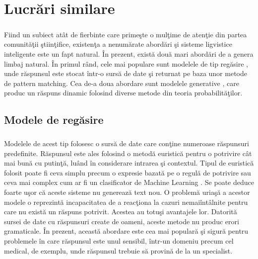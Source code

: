\chapter{Lucr\u ari similare}

\paragraph{}
Fiind un subiect at\^ at de fierbinte care prime\c ste o mul\c time de aten\c tie din partea comunit\u a\c tii \c stiin\c tifice, existen\c ta a nenum\u arate abord\u ari \c si sisteme ligvistice inteligente este un fapt natural. \^ In prezent, exist\u a dou\u a mari abord\u ari de a genera limbaj natural. \^ In primul r\^ and, cele mai populare sunt modelele de tip reg\u asire \cite{chatbot-models}, unde r\u aspunsul este stocat \^ intr-o surs\u a de date \c si returnat pe baza unor metode de pattern matching. Cea de-a doua abordare sunt modelele generative \cite{chatbot-models}, care produc un r\u aspuns dinamic folosind diverse metode din teoria probabilit\u a\c tilor.

\section{Modele de reg\u asire}

\paragraph{}
Modelele de acest tip folosesc o surs\u a de date care con\c tine numeroase r\u aspunsuri predefinite. R\u aspunsul este ales folosind o metod\u a euristic\u a pentru o potrivire c\^ at mai bun\u a cu putin\c t\u a, lu\^ and \^ in considerare intrarea \c si contextul. Tipul de euristic\u a folosit poate fi ceva simplu precum o expresie bazat\u a pe o regul\u a de potrivire sau ceva mai complex cum ar fi un clasificator de Machine Learning \cite{retrieval-chatbots}. Se poate deduce foarte u\c sor c\u a aceste sisteme nu genereaz\u a text nou. O problem\u a uria\c s\u a a acestor modele o reprezint\u a incapacitatea de a reac\c tiona la cazuri nemai\^ int\^ alnite pentru care nu exist\u a un r\u aspuns potrivit. Acestea au totu\c si avantajele lor. Datorit\u a sursei de date cu r\u aspunsuri create de oameni, aceste metode nu produc erori gramaticale. \^ In prezent, aceast\u a abordare este cea mai popular\u a \c si sigur\u a pentru problemele \^ in care r\u aspunsul este unul sensibil, \^ intr-un domeniu precum cel medical, de exemplu, unde r\u aspunsul trebuie s\u a provin\u a de la un specialist.

